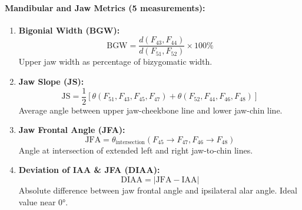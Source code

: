 \paragraph{Mandibular and Jaw Metrics (5 measurements):}
\begin{enumerate}[resume]
    \item \textbf{Bigonial Width (BGW):}
    \begin{equation}
    \text{BGW} = \frac{d(F_{43}, F_{44})}{d(F_{51}, F_{52})} \times 100\%
    \end{equation}
    Upper jaw width as percentage of bizygomatic width.
    
    \item \textbf{Jaw Slope (JS):}
    \begin{equation}
    \text{JS} = \frac{1}{2}\left[\theta(F_{51}, F_{43}, F_{45}, F_{47}) + \theta(F_{52}, F_{44}, F_{46}, F_{48})\right]
    \end{equation}
    Average angle between upper jaw-cheekbone line and lower jaw-chin line.
    
    \item \textbf{Jaw Frontal Angle (JFA):}
    \begin{equation}
    \text{JFA} = \theta_{\text{intersection}}(F_{45} \to F_{47}, F_{46} \to F_{48})
    \end{equation}
    Angle at intersection of extended left and right jaw-to-chin lines.
    
    \item \textbf{Deviation of IAA \& JFA (DIAA):}
    \begin{equation}
    \text{DIAA} = |\text{JFA} - \text{IAA}|
    \end{equation}
    Absolute difference between jaw frontal angle and ipsilateral alar angle. Ideal value near 0°.
\end{enumerate}

